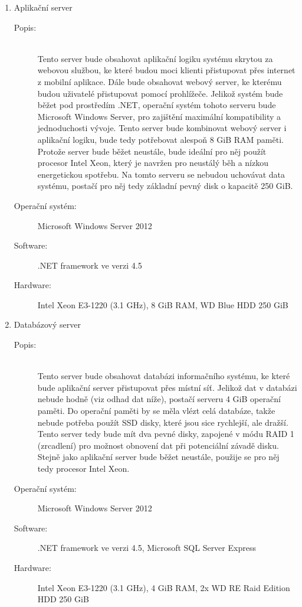 \documentclass[a4paper,10pt,titlepage]{article}
\begin{document}
		\begin{enumerate}
			\item Aplikační server
				\begin{description}
					\item[Popis:] \hfill \\Tento server bude obsahovat aplikační logiku systému skrytou za webovou službou, ke které budou moci klienti přistupovat přes
						internet z mobilní aplikace. Dále bude obsahovat webový server, ke kterému budou uživatelé přistupovat pomocí prohlížeče.
						Jelikož systém bude běžet pod prostředím .NET, operační systém tohoto serveru bude Microsoft Windows Server, pro zajištění maximální kompatibility
						a jednoduchosti vývoje. Tento server bude kombinovat webový server i aplikační logiku, bude tedy potřebovat alespoň 8 GiB RAM paměti.
						Protože server bude běžet neustále, bude ideální pro něj použít procesor Intel Xeon, který je navržen pro neustálý běh a nízkou energetickou spotřebu.
						Na tomto serveru se nebudou uchovávat data systému, postačí pro něj tedy základní pevný disk o kapacitě 250 GiB.
					\item[Operační systém:] Microsoft Windows Server 2012
					\item[Software:] .NET framework ve verzi 4.5
					\item[Hardware:] Intel Xeon E3-1220 (3.1 GHz), 8 GiB RAM, WD Blue HDD 250 GiB
				\end{description}
			\item Databázový server
			\begin{description}
				\item[Popis:] \hfill \\Tento server bude obsahovat databázi informačního systému, ke které bude aplikační server přistupovat přes místní síť.
						Jelikož dat v databázi nebude hodně (viz odhad dat níže), postačí serveru 4 GiB operační paměti. Do operační paměti by se měla vlézt celá databáze, takže nebude potřeba použít SSD disky, které jsou sice rychlejší, ale dražší. Tento server tedy bude mít dva pevné disky, zapojené v módu RAID 1 (zrcadlení) pro možnost obnovení dat při potenciální závadě disku.  Stejně jako aplikační server bude běžet neustále, použije se pro něj tedy procesor Intel Xeon.
				\item[Operační systém:] Microsoft Windows Server 2012
				\item[Software:] .NET framework ve verzi 4.5, Microsoft SQL Server Express
				\item[Hardware:] Intel Xeon E3-1220 (3.1 GHz), 4 GiB RAM, 2x WD RE Raid Edition HDD 250 GiB

\end{description}
\end{enumerate}
\end{document}
